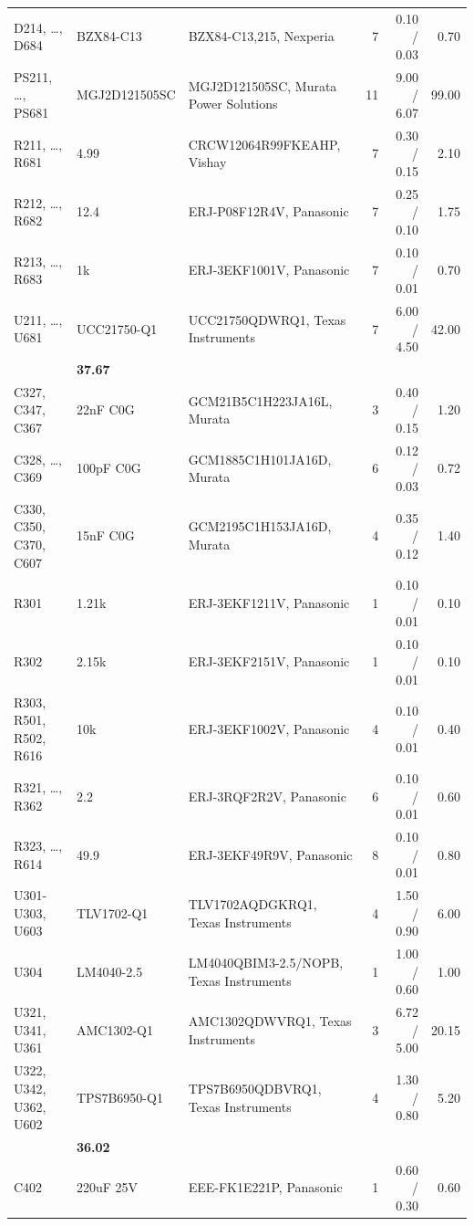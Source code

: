 \begin{longtable}{L{0.19\textwidth}L{0.16\textwidth}L{0.28\textwidth}rrr}
D214, \dots, D684 & BZX84-C13 & BZX84-C13,215, Nexperia & 7 & 0.10 / 0.03 & 0.70 \\
PS211, \dots, PS681 & MGJ2D121505SC & MGJ2D121505SC, Murata Power Solutions & 11 & 9.00 / 6.07 & 99.00 \\
R211, \dots, R681 & 4.99 & CRCW12064R99FKEAHP, Vishay & 7 & 0.30 / 0.15 & 2.10 \\
R212, \dots, R682 & 12.4 & ERJ-P08F12R4V, Panasonic & 7 & 0.25 / 0.10 & 1.75 \\
R213, \dots, R683 & 1k & ERJ-3EKF1001V, Panasonic & 7 & 0.10 / 0.01 & 0.70 \\
U211, \dots, U681 & UCC21750-Q1 & UCC21750QDWRQ1, Texas Instruments & 7 & 6.00 / 4.50 & 42.00 \\
\addlinespace
{} & \textbf{37.67} \\
C327, C347, C367 & 22nF C0G & GCM21B5C1H223JA16L, Murata & 3 & 0.40 / 0.15 & 1.20 \\
C328, \dots, C369 & 100pF C0G & GCM1885C1H101JA16D, Murata & 6 & 0.12 / 0.03 & 0.72 \\
C330, C350, C370, C607 & 15nF C0G & GCM2195C1H153JA16D, Murata & 4 & 0.35 / 0.12 & 1.40 \\
R301 & 1.21k & ERJ-3EKF1211V, Panasonic & 1 & 0.10 / 0.01 & 0.10 \\
R302 & 2.15k & ERJ-3EKF2151V, Panasonic & 1 & 0.10 / 0.01 & 0.10 \\
R303, R501, R502, R616 & 10k & ERJ-3EKF1002V, Panasonic & 4 & 0.10 / 0.01 & 0.40 \\
R321, \dots, R362 & 2.2 & ERJ-3RQF2R2V, Panasonic & 6 & 0.10 / 0.01 & 0.60 \\
R323, \dots, R614 & 49.9 & ERJ-3EKF49R9V, Panasonic & 8 & 0.10 / 0.01 & 0.80 \\
U301-U303, U603 & TLV1702-Q1 & TLV1702AQDGKRQ1, Texas Instruments & 4 & 1.50 / 0.90 & 6.00 \\
U304 & LM4040-2.5 & LM4040QBIM3-2.5/NOPB, Texas Instruments & 1 & 1.00 / 0.60 & 1.00 \\
U321, U341, U361 & AMC1302-Q1 & AMC1302QDWVRQ1, Texas Instruments & 3 & 6.72 / 5.00 & 20.15 \\
U322, U342, U362, U602 & TPS7B6950-Q1 & TPS7B6950QDBVRQ1, Texas Instruments & 4 & 1.30 / 0.80 & 5.20 \\
\addlinespace
{} & \textbf{36.02} \\
C402 & 220uF 25V & EEE-FK1E221P, Panasonic & 1 & 0.60 / 0.30 & 0.60 \\

\end{longtable}
